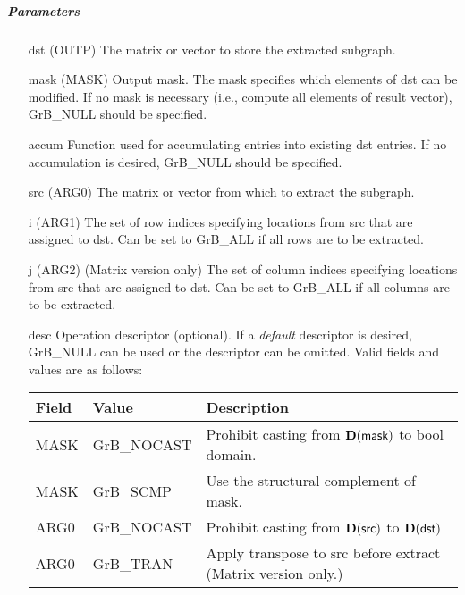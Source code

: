 \subparagraph{Parameters}

\begin{itemize}[leftmargin=1in]
    \item[{\sf dst}]   ({\sf OUTP}) The matrix or vector to store the extracted subgraph.

    \item[{\sf mask}] ({\sf MASK}) Output mask. The mask
    specifies which elements of {\sf dst} can be modified.
    If no mask is necessary (i.e., compute all elements of result
    vector), {\sf GrB\_NULL} should be specified.

    \item[{\sf accum}]  Function used for accumulating entries into existing {\sf dst} entries. 
			If no accumulation is desired, {\sf GrB\_NULL} should be specified.

    \item[{\sf src}]   ({\sf ARG0}) The matrix or vector from which to extract the subgraph.
    \item[{\sf i}]     ({\sf ARG1}) The set of row indices specifying locations from src that
                              are assigned to dst. Can
                              be set to {\sf GrB\_ALL} if all rows are
                              to be extracted.
    \item[{\sf j}]     ({\sf ARG2}) (Matrix version only) The set of column indices specifying
                              locations from src that are assigned to dst. Can
                              be set to {\sf GrB\_ALL} if all columns are
                              to be extracted.


    \item[{\sf desc}]   Operation descriptor (optional). If a
    \emph{default} descriptor is desired, {\sf GrB\_NULL} can be
    used or the descriptor can be omitted.  Valid fields and values are as follows: \\
    \begin{tabular}{lll}
    Field  & Value & Description \\
    \hline
    {\sf MASK} & {\sf GrB\_NOCAST} & Prohibit casting from $\bold{D}({\sf mask})$ to {\sf bool} domain. \\
    {\sf MASK} & {\sf GrB\_SCMP}   & Use the structural complement of {\sf mask}. \\
    {\sf ARG0} & {\sf GrB\_NOCAST} & Prohibit casting from $\bold{D}({\sf src})$ to $\bold{D}({\sf dst})$ \\
    {\sf ARG0} & {\sf GrB\_TRAN}   & Apply transpose to {\sf src} before extract (Matrix version only.) \\
    \end{tabular}
\end{itemize}


